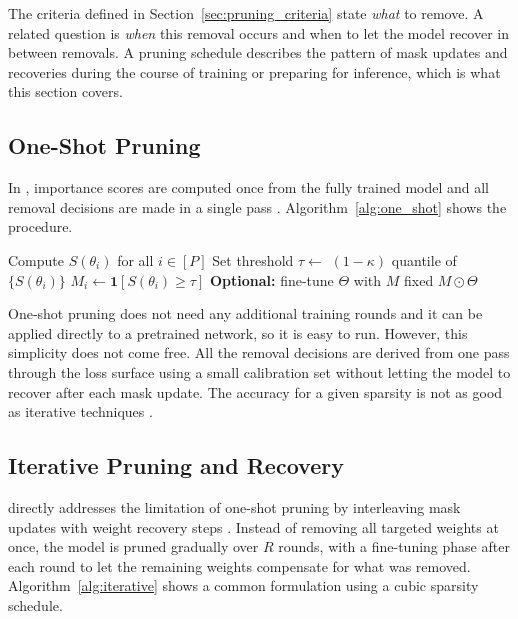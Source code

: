 The criteria defined in Section~\ref{sec:pruning_criteria} state \emph{what} to remove. A related question is
\emph{when} this removal occurs and when to let the model recover in between
removals. A pruning schedule describes the pattern of mask updates and
recoveries during the course of training or preparing for inference, which is
what this section covers.

\subsection{One-Shot Pruning}
\label{subsec:one_shot_pruning}

In , importance scores are computed once from the
fully trained model and all removal decisions are made in a single pass
\cite{han2015deep}. Algorithm~\ref{alg:one_shot} shows the procedure.

\begin{algorithm2e}[H]
	\SetAlgoLined
	Compute $S(\theta_i)$ for all $i \in [P]$\;
	Set threshold $\tau \leftarrow$ $(1-\kappa)$ quantile of $\{S(\theta_i)\}$\;
	$M_i \leftarrow \mathbf{1}[S(\theta_i) \ge \tau]$\;
	\textbf{Optional:} fine-tune $\Theta$ with $M$ fixed\;
	\Return $M \odot \Theta$\;
	\caption{One-Shot Pruning}
	\label{alg:one_shot}
\end{algorithm2e}

One-shot pruning does not need any additional training rounds and it can be applied directly to a pretrained network, so it is easy to run. However, this simplicity does not come free. All the removal decisions are derived from one pass through the loss surface using a small calibration set without letting the model to recover after each mask update. The accuracy for a given sparsity is not as good as iterative techniques \cite{han2015deep,zhu2018prune}.

\subsection{Iterative Pruning and Recovery}
\label{subsec:iterative_pruning}

 directly addresses the limitation of one-shot
pruning by interleaving mask updates with weight recovery steps \cite{zhu2018prune}. Instead of removing
all targeted weights at once, the model is pruned gradually over $R$ rounds,
with a fine-tuning phase after each round to let the remaining weights
compensate for what was removed. Algorithm~\ref{alg:iterative} shows a
common formulation using a cubic sparsity schedule.

